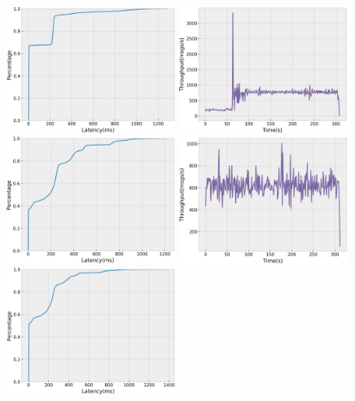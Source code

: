 \begin{figure}[H]
  \centering
  \includegraphics[width=0.49\textwidth,height=\textheight,keepaspectratio]{img/constant50_lat.png}
  \includegraphics[width=0.49\textwidth,height=\textheight,keepaspectratio]{img/constant50_tp.png}
  \includegraphics[width=0.49\textwidth,height=\textheight,keepaspectratio]{img/constant10_lat.png}
  \includegraphics[width=0.49\textwidth,height=\textheight,keepaspectratio]{img/constant10_tp.png}
  \includegraphics[width=0.49\textwidth,height=\textheight,keepaspectratio]{img/constant5_lat.png}

\end{figure}

